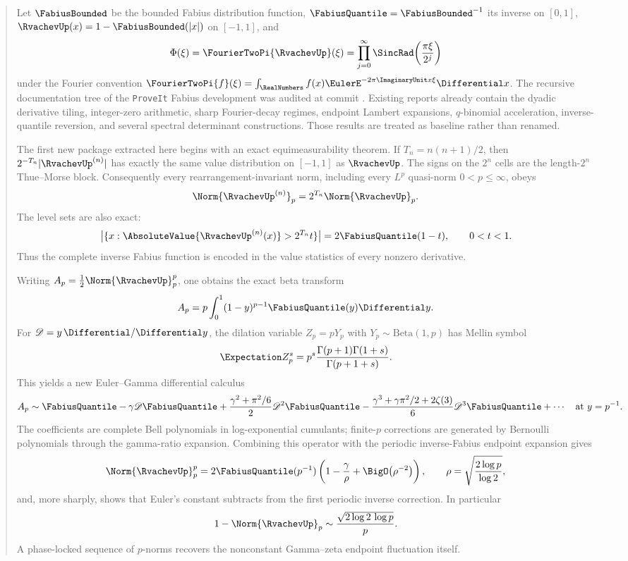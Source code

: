 \documentclass[11pt,oneside]{article}
\theoremstyle{definition}
\theoremstyle{remark}
\begin{document}
\begin{abstract}
Let $\FabiusBounded$ be the bounded Fabius distribution function,
$\FabiusQuantile=\FabiusBounded^{-1}$ its inverse on $[0,1]$,
$\RvachevUp(x)=1-\FabiusBounded(|x|)$ on $[-1,1]$, and
\[
 \Phi(\xi)=\FourierTwoPi{\RvachevUp}(\xi)
 =\prod_{j=0}^{\infty}\SincRad\!\left(\frac{\pi\xi}{2^j}\right)
\]
under the Fourier convention
$\FourierTwoPi{f}(\xi)=\int_{\RealNumbers}f(x)\EulerE^{-2\pi\ImaginaryUnit x\xi}\Differential x$.
The recursive documentation tree of the \texttt{ProveIt} Fabius development was audited at
commit \RepoCommit.  Existing reports already contain the dyadic derivative tiling,
integer-zero arithmetic, sharp Fourier-decay regimes, endpoint Lambert expansions,
$q$-binomial acceleration, inverse-quantile reversion, and several spectral determinant
constructions.  Those results are treated as baseline rather than renamed.

The first new package extracted here begins with an exact equimeasurability theorem.  If
$T_n=n(n+1)/2$, then $2^{-T_n}|\RvachevUp^{(n)}|$ has exactly the same value distribution on
$[-1,1]$ as $\RvachevUp$.  The signs on the $2^n$ cells are the length-$2^n$ Thue--Morse block.
Consequently every rearrangement-invariant norm, including every $L^p$ quasi-norm
$0<p\leq\infty$, obeys
\[
 \Norm{\RvachevUp^{(n)}}_p=2^{T_n}\Norm{\RvachevUp}_p.
\]
The level sets are also exact:
\[
 \bigl|\{x:\AbsoluteValue{\RvachevUp^{(n)}(x)}>2^{T_n}t\}\bigr|
 =2\FabiusQuantile(1-t),
 \qquad 0<t<1.
\]
Thus the complete inverse Fabius function is encoded in the value statistics of every
nonzero derivative.

Writing
$A_p=\tfrac12\Norm{\RvachevUp}_p^p$, one obtains the exact beta transform
\[
 A_p=p\int_0^1(1-y)^{p-1}\FabiusQuantile(y)\Differential y.
\]
For $\Dop=y\,\Differential/\Differential y$, the dilation variable $Z_p=pY_p$ with
$Y_p\sim\mathrm{Beta}(1,p)$ has Mellin symbol
\[
 \Expectation Z_p^s=p^s\frac{\Gamma(p+1)\Gamma(1+s)}{\Gamma(p+1+s)}.
\]
This yields a new Euler--Gamma differential calculus
\[
 A_p\sim
 \FabiusQuantile-\gamma\Dop\FabiusQuantile
 +\frac{\gamma^2+\pi^2/6}{2}\Dop^2\FabiusQuantile
 -\frac{\gamma^3+\gamma\pi^2/2+2\zeta(3)}{6}\Dop^3\FabiusQuantile+\cdots
 \quad\text{at }y=p^{-1}.
\]
The coefficients are complete Bell polynomials in log-exponential cumulants; finite-$p$
corrections are generated by Bernoulli polynomials through the gamma-ratio expansion.
Combining this operator with the periodic inverse-Fabius endpoint expansion gives
\[
 \Norm{\RvachevUp}_p^p
 =2\FabiusQuantile(p^{-1})\left(1-\frac{\gamma}{\rho}
 +\BigO\!\left(\rho^{-2}\right)\right),
 \qquad
 \rho=\sqrt{\frac{2\log p}{\log2}},
\]
and, more sharply, shows that Euler's constant subtracts from the first periodic inverse
correction.  In particular
\[
 1-\Norm{\RvachevUp}_p\sim\frac{\sqrt{2\log2\,\log p}}{p}.
\]
A phase-locked sequence of $p$-norms recovers the nonconstant Gamma--zeta endpoint
fluctuation itself.


\end{abstract}
\end{document}
